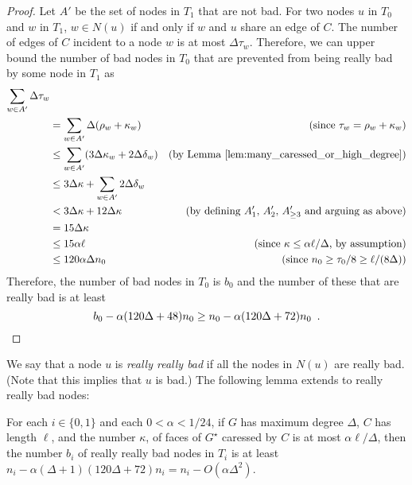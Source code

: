 \documentclass{patmorin}
\newcommand{\dual}[1]{{#1}^\star}
\begin{document}
\begin{proof}
  Let $A'$ be the set of nodes in $T_1$ that are not bad.  For two
  nodes $u$ in $T_0$ and $w$ in $T_1$,  $w\in N(u)$ if and only if $w$
  and $u$ share an edge of $C$.  The number of edges of $C$ incident to a node $w$ is at most $\Delta\tau_w$.  Therefore, we can upper bound the number of bad nodes in $T_0$ that are prevented from being really bad by some node in $T_1$ as
  \begin{align*}
   \sum_{w\in A'}\Delta \tau_w \\
    & = \sum_{w\in A'}\Delta (\rho_w+\kappa_w)
    & \text{(since $\tau_w=\rho_w+\kappa_w$)} \\
    & \le  \sum_{w\in A'}(3\Delta\kappa_w + 2\Delta\delta_w) & \text{(by \lemref{many_caressed_or_high_degree})} \\
    & \le  3\Delta\kappa + \sum_{w\in A'}2\Delta\delta_w \\
    & < 3\Delta\kappa + 12\Delta\kappa & \text{(by defining $A'_1$, $A'_2$, $A'_{\ge 3}$ and arguing as above)}\\
    & = 15\Delta\kappa \\
    & \le 15\alpha\ell & \text{(since $\kappa\le\alpha\ell/\Delta$, by assumption)} \\
    & \le 120\alpha\Delta n_0 & \text{(since $n_0\ge \tau_0/8\ge \ell/(8\Delta)$)}
  \end{align*}
  Therefore, the number of bad nodes in $T_0$ is $b_0$ and the number of these that are really bad is at least
  \[
     b_0 - \alpha(120\Delta + 48)n_0 \ge
     n_0 - \alpha(120\Delta + 72)n_0 \enspace . \qedhere
  \]
\end{proof}

We say that a node $u$ is \emph{really really bad} if all the nodes in $N(u)$ are really bad.  (Note that this implies that $u$ is bad.)  The following lemma extends  to really really bad nodes:

\begin{lem}
  For each $i\in\{0,1\}$ and each $0<\alpha < 1/24$,
  if $G$ has maximum degree $\Delta$, $C$ has length $\ell$, and the number
  $\kappa$, of faces of $\dual{G}$ caressed by $C$ is at most $\alpha\ell/\Delta$, then the number $b_i$ of really really bad nodes in $T_i$ is at least $n_i - \alpha(\Delta+1)(120\Delta+72) n_i= n_i - O(\alpha\Delta^2)$.
\end{lem}
\end{document}
